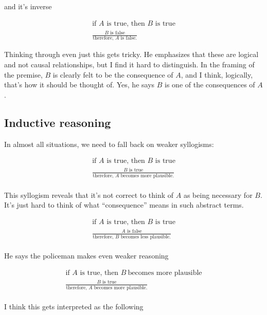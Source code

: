 \noindent and it's inverse

\begin{gather*}
    \text{if } A \text{ is true, then } B \text{ is true}\\
    \frac{B \text{ is false}}{\text{therefore, } A \text{ is false.}}
\end{gather*}

\noindent Thinking through even just this gets tricky. He emphasizes that these are
logical and not causal relationships, but I find it hard to distinguish. In the framing of
the premise, $B$ is clearly felt to be the consequence of $A$, and I think, logically,
that's how it should be thought of. Yes, he says $B$ is one of the consequences of $A$.

\subsection{Inductive reasoning}

In almost all situations, we need to fall back on weaker syllogisms:

\begin{gather*}
    \text{if } A \text{ is true, then } B \text{ is true}\\
    \frac{B \text{ is true}}{\text{therefore, } A \text{ becomes more plausible.}}
\end{gather*}
\\

\noindent This syllogism reveals that it's not correct to think of $A$ as being necessary
for $B$. It's just hard to think of what ``consequence'' means in such abstract terms.

\begin{gather*}
    \text{if } A \text{ is true, then } B \text{ is true}\\
    \frac{A \text{ is false}}{\text{therefore, } B \text{ becomes less plausible.}}
\end{gather*}
\\
\noindent He says the policeman makes even weaker reasoning

\begin{gather*}
    \text{if } A \text{ is true, then } B~\text{becomes more plausible}\\
    \frac{B \text{ is true}}{\text{therefore, } A \text{ becomes more plausible.}}
\end{gather*}
\\
\noindent I think this gets interpreted as the following

